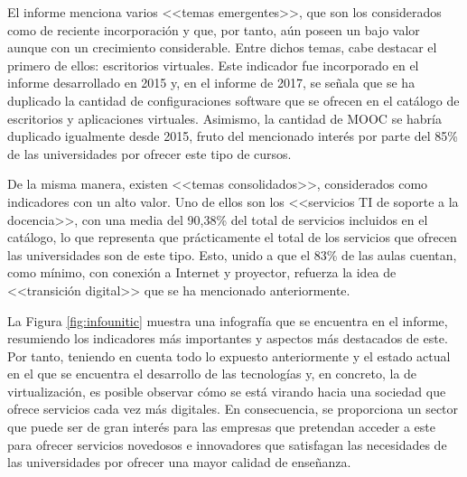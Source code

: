 El informe menciona varios <<temas emergentes>>, que son los considerados como de reciente incorporación y que, por tanto, aún poseen un bajo valor aunque con un crecimiento considerable. Entre dichos temas, cabe destacar el primero de ellos: escritorios virtuales. Este indicador fue incorporado en el informe desarrollado en 2015 y, en el informe de 2017, se señala que se ha duplicado la cantidad de configuraciones software que se ofrecen en el catálogo de escritorios y aplicaciones virtuales. Asimismo, la cantidad de \acs{MOOC} se habría duplicado igualmente desde 2015, fruto del mencionado interés por parte del 85\% de las universidades por ofrecer este tipo de cursos.

De la misma manera, existen <<temas consolidados>>, considerados como indicadores con un alto valor. Uno de ellos son los <<servicios \acs{TI} de soporte a la docencia>>, con una media del 90,38\% del total de servicios incluidos en el catálogo, lo que representa que prácticamente el total de los servicios que ofrecen las universidades son de este tipo. Esto, unido a que el 83\% de las aulas cuentan, como mínimo, con conexión a Internet y proyector, refuerza la idea de <<transición digital>> que se ha mencionado anteriormente.

La Figura \ref{fig:infounitic} muestra una infografía que se encuentra en el informe, resumiendo los indicadores más importantes y aspectos más destacados de este. Por tanto, teniendo en cuenta todo lo expuesto anteriormente y el estado actual en el que se encuentra el desarrollo de las tecnologías y, en concreto, la de virtualización, es posible observar cómo se está virando hacia una sociedad que ofrece servicios cada vez más digitales. En consecuencia, se proporciona un sector que puede ser de gran interés para las empresas que pretendan acceder a este para ofrecer servicios novedosos e innovadores que satisfagan las necesidades de las universidades por ofrecer una mayor calidad de enseñanza.

